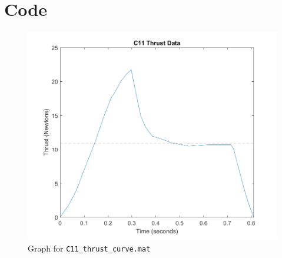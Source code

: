 \documentclass[11pt]{article}
\begin{document}
\section{Code}









\newpage

\begin{figure}
    \centering
    \includegraphics{c11.png}
    \caption{Graph for \texttt{C11\_thrust\_curve.mat}}
    \label{fig:c11}
\end{figure}
\end{document}

